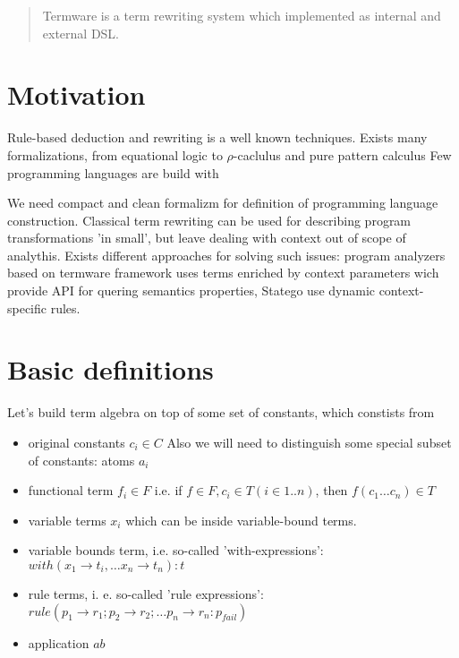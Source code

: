 \documentclass[12pt]{article}
\begin{document}
\maketitle

\begin{abstract}
 Termware is a term rewriting system which implemented as internal and external DSL.
\end{abstract}

\section{Motivation}

  Rule-based deduction and rewriting is a well known techniques. Exists many formalizations, from
  equational logic to $\rho$-caclulus \cite{RhoCal-Wrla2002} and pure pattern calculus\cite{Jay05purepattern}   Few programming languages are build
  with 


  We need compact and clean formalizm for definition of programming language construction. Classical term
 rewriting can be used for describing program transformations 'in small', but leave dealing with context out 
 of scope of analythis. Exists different approaches for solving such issues: program analyzers based on 
 termware framework \cite{DBLP:journals/fuin/DoroshenkoS06} uses terms enriched by context parameters wich provide
 API for quering semantics properties, Statego\cite{BravenboerKVV08} use dynamic context-specific rules.
  
  


\section{Basic definitions}

   Let's build term algebra on top of some set of constants, which constists from
\begin{itemize}
 \item original constants ${c_i} \in C$ Also we
 will need to distinguish some special subset of constants: atoms ${a_i}$
 \item functional term $f_i \in F$  i.e. if $f \in F, c_i \in T (i \in 1..n)$, then $f(c_{1} \dots c_{n}) \in T$
 \item variable terms $x_{i}$ which can be inside variable-bound terms.
 \item variable bounds term, i.e. so-called 'with-expressions': $with(x_1 \to t_i,\dots x_n\to t_n):t$
 \item rule terms, i. e. so-called 'rule expressions': 
       $rule(p_1 \to r_1; p_2 \to r_2 ; \dots p_n \to r_n : p_{fail})$
 \item application $a b$
\end{itemize}
\end{document}
